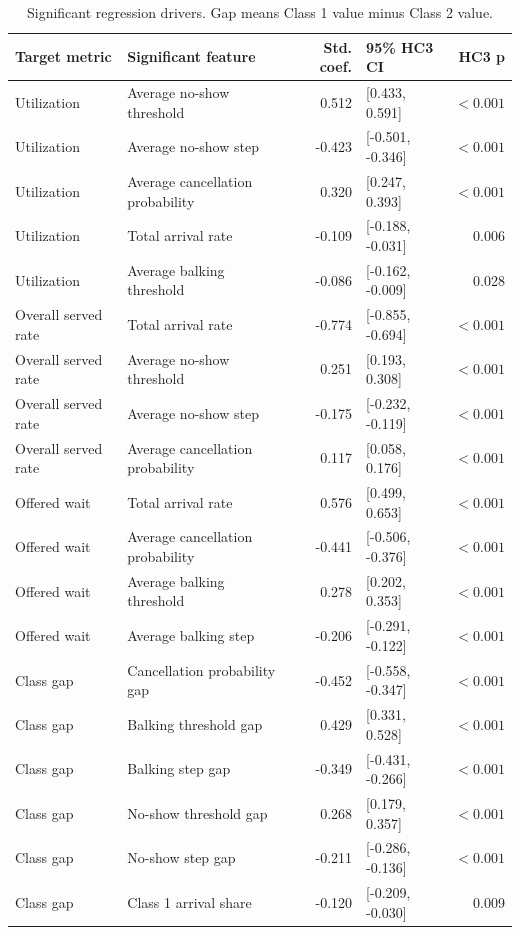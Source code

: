 \documentclass[11pt]{article}
\begin{document}
\begin{table}[H]
\centering
\small
\renewcommand{\arraystretch}{1.08}
\begin{tabular}{p{}p{}rp{}r}
\toprule
Target metric & Significant feature & Std. coef. & 95\% HC3 CI & HC3 p \\
\midrule
Utilization & Average no-show threshold & 0.512 & [0.433, 0.591] & $<0.001$ \\
Utilization & Average no-show step & -0.423 & [-0.501, -0.346] & $<0.001$ \\
Utilization & Average cancellation probability & 0.320 & [0.247, 0.393] & $<0.001$ \\
Utilization & Total arrival rate & -0.109 & [-0.188, -0.031] & 0.006 \\
Utilization & Average balking threshold & -0.086 & [-0.162, -0.009] & 0.028 \\
Overall served rate & Total arrival rate & -0.774 & [-0.855, -0.694] & $<0.001$ \\
Overall served rate & Average no-show threshold & 0.251 & [0.193, 0.308] & $<0.001$ \\
Overall served rate & Average no-show step & -0.175 & [-0.232, -0.119] & $<0.001$ \\
Overall served rate & Average cancellation probability & 0.117 & [0.058, 0.176] & $<0.001$ \\
Offered wait & Total arrival rate & 0.576 & [0.499, 0.653] & $<0.001$ \\
Offered wait & Average cancellation probability & -0.441 & [-0.506, -0.376] & $<0.001$ \\
Offered wait & Average balking threshold & 0.278 & [0.202, 0.353] & $<0.001$ \\
Offered wait & Average balking step & -0.206 & [-0.291, -0.122] & $<0.001$ \\
Class gap & Cancellation probability gap & -0.452 & [-0.558, -0.347] & $<0.001$ \\
Class gap & Balking threshold gap & 0.429 & [0.331, 0.528] & $<0.001$ \\
Class gap & Balking step gap & -0.349 & [-0.431, -0.266] & $<0.001$ \\
Class gap & No-show threshold gap & 0.268 & [0.179, 0.357] & $<0.001$ \\
Class gap & No-show step gap & -0.211 & [-0.286, -0.136] & $<0.001$ \\
Class gap & Class 1 arrival share & -0.120 & [-0.209, -0.030] & 0.009 \\
\bottomrule
\end{tabular}
\caption{Significant regression drivers. Gap means Class 1 value minus Class 2 value.}
\end{table}
\end{document}
